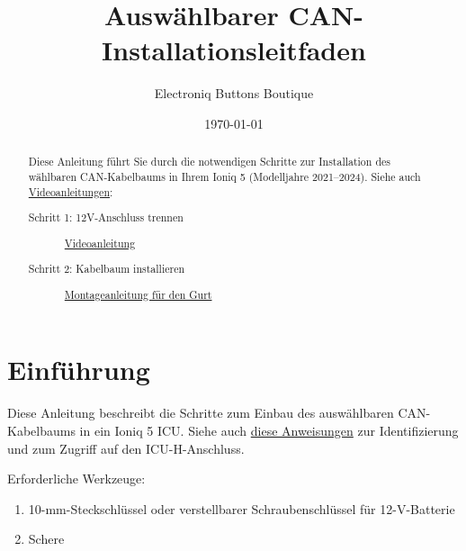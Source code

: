 \documentclass[superscriptaddress,onecolumn,floatfix]{revtex4-2}
\makeatletter
\DeclareRobustCommand{\selectlanguage}[1]{%
    \@ifundefined{alias@\string#1}
      {\ORIGselectlanguage{#1}}
      {\begingroup\edef\x{\endgroup
         \noexpand\ORIGselectlanguage{\@nameuse{alias@#1}}}\x}%
}
\makeatother
\begin{document}
\selectlanguage{de}

\begin{abstract}
  Diese Anleitung führt Sie durch die notwendigen Schritte zur Installation des wählbaren CAN-Kabelbaums in Ihrem Ioniq 5 (Modelljahre 2021–2024). Siehe auch \href{https://youtube.com/playlist?list=PLYCTmVJH4UYqnw87UZAaqMo1GrOv0cJaL}{Videoanleitungen}:
  \begin{description}
    \item[Schritt 1: 12V-Anschluss trennen] \href{https://youtu.be/ePBdyeBYKk4}{Videoanleitung}
    \item[Schritt 2: Kabelbaum installieren] \href{https://youtu.be/kVvkR4ZLFMI}{Montageanleitung für den Gurt}
  \end{description}
\end{abstract}
\title{Auswählbarer CAN-Installationsleitfaden}
\author{Electroniq Buttons Boutique}
\date{\today}

\maketitle


\section{Einführung}
Diese Anleitung beschreibt die Schritte zum Einbau des auswählbaren CAN-Kabelbaums in ein Ioniq 5 ICU. Siehe auch \href{https://github.com/dragz/explorationsincarhacking/blob/main/articles/getting_past_the_secure_gateway/getting_past_the_secure_gateway.md}{diese Anweisungen} zur Identifizierung und zum Zugriff auf den ICU-H-Anschluss.

Erforderliche Werkzeuge:
\begin{enumerate}
  \item 10-mm-Steckschlüssel oder verstellbarer Schraubenschlüssel für 12-V-Batterie
  \item Schere
\end{enumerate}
\end{document}
